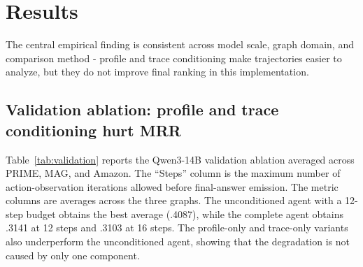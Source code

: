 \section{Results}
The central empirical finding is consistent across model scale, graph domain, and comparison method - profile and trace conditioning make trajectories easier to analyze, but they do not improve final ranking in this implementation.

\subsection{Validation ablation: profile and trace conditioning hurt MRR}
Table~\ref{tab:validation} reports the Qwen3-14B validation ablation averaged across PRIME, MAG, and Amazon. The ``Steps'' column is the maximum number of action-observation iterations allowed before final-answer emission. The metric columns are averages across the three graphs. The unconditioned agent with a 12-step budget obtains the best average \mrr (.4087), while the complete \tb agent obtains .3141 at 12 steps and .3103 at 16 steps. The profile-only and trace-only variants also underperform the unconditioned agent, showing that the degradation is not caused by only one component.

\begin{table}[t]
\centering
\caption{\textbf{Validation ablation averaged over PRIME, MAG, and Amazon.} The unconditioned agent is strongest, while the combined \tb agent loses both rank precision and recall.}
\label{tab:validation}
\end{table}

